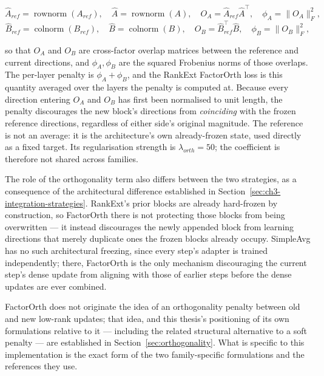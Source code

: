 \begin{equation}
\label{eq:ch3-factororth-a}
\hat A_{ref} = \operatorname{rownorm}(A_{ref}), \quad
\hat A = \operatorname{rownorm}(A), \quad
O_A = \hat A_{ref}\hat A^{\top}, \quad
\phi_A = \lVert O_A \rVert_F^2,
\end{equation}
\begin{equation}
\label{eq:ch3-factororth-b}
\hat B_{ref} = \operatorname{colnorm}(B_{ref}), \quad
\hat B = \operatorname{colnorm}(B), \quad
O_B = \hat B_{ref}^{\top}\hat B, \quad
\phi_B = \lVert O_B \rVert_F^2,
\end{equation}

so that $O_A$ and $O_B$ are cross-factor overlap matrices between the
reference and current directions, and $\phi_A,\phi_B$ are the squared
Frobenius norms of those overlaps. The per-layer penalty is
$\phi_A+\phi_B$, and the RankExt FactorOrth loss is this quantity averaged
over the layers the penalty is computed at. Because every direction
entering $O_A$ and $O_B$ has first been normalised to unit length, the
penalty discourages the new block's directions from \emph{coinciding} with
the frozen reference directions, regardless of either side's original
magnitude. The reference is not an average: it is the architecture's own
already-frozen state, used directly as a fixed target. Its regularisation
strength is $\lambda_{orth}=50$; the coefficient is therefore not shared
across families.

The role of the orthogonality term also differs between the two
strategies, as a consequence of the architectural difference established in
Section~\ref{sec:ch3-integration-strategies}. RankExt's prior blocks are
already hard-frozen by construction, so FactorOrth there is not protecting
those blocks from being overwritten --- it instead discourages the newly
appended block from learning directions that merely duplicate ones the
frozen blocks already occupy. SimpleAvg has no such architectural freezing,
since every step's adapter is trained independently; there, FactorOrth is
the only mechanism discouraging the current step's dense update from
aligning with those of earlier steps before the dense updates are ever
combined.

FactorOrth does not originate the idea of an orthogonality penalty between
old and new low-rank updates; that idea, and this thesis's positioning of
its own formulations relative to it --- including the related structural
alternative to a soft penalty --- are established in Section~\ref{sec:orthogonality}.
What is specific to this implementation is the exact form of the two
family-specific formulations and the references they use.

